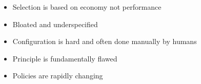 \begin{itemize}
\begin{itemize}
\begin{itemize}
\begin{itemize}
                        \end{itemize}
                        \begin{itemize}
                            \item Selection is based on economy not performance
                        \end{itemize}
                        \begin{itemize}
                            \item Bloated and underspecified
                            \item Configuration is hard and often done manually by humans
                            \item Principle is fundamentally flawed
                        \end{itemize}
                        \begin{itemize}
                            \item Policies are rapidly changing
                        \end{itemize}
                \end{itemize}
        \end{itemize}
\end{itemize}
